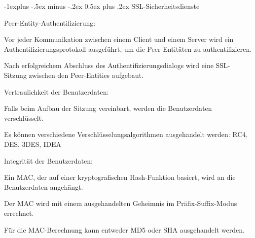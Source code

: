 \documentclass[a4paper]{article}
\makeatletter
\renewcommand{\subsection}{\@startsection{subsection}{2}{0mm}%
 {-1explus -.5ex minus -.2ex}%
 {0.5ex plus .2ex}%
 {\normalfont\normalsize\bfseries}}
\makeatother
\begin{document}
\begin{multicols}{3}
      \subsection{SSL-Sicherheitsdienste}
      \begin{itemize*}
            \item Peer-Entity-Authentifizierung:
            \begin{itemize*}
                  \item Vor jeder Kommunikation zwischen einem Client und einem Server wird ein Authentifizierungsprotokoll ausgeführt, um die Peer-Entitäten zu authentifizieren.
                  \item Nach erfolgreichem Abschluss des Authentifizierungsdialogs wird eine SSL-Sitzung zwischen den Peer-Entities aufgebaut.
            \end{itemize*}
            \item Vertraulichkeit der Benutzerdaten:
            \begin{itemize*}
                  \item Falls beim Aufbau der Sitzung vereinbart, werden die Benutzerdaten verschlüsselt.
                  \item Es können verschiedene Verschlüsselungsalgorithmen ausgehandelt werden: RC4, DES, 3DES, IDEA
            \end{itemize*}
            \item Integrität der Benutzerdaten:
            \begin{itemize*}
                  \item Ein MAC, der auf einer kryptografischen Hash-Funktion basiert, wird an die Benutzerdaten angehängt.
                  \item Der MAC wird mit einem ausgehandelten Geheimnis im Präfix-Suffix-Modus errechnet.
                  \item Für die MAC-Berechnung kann entweder MD5 oder SHA ausgehandelt werden.
            \end{itemize*}
      \end{itemize*}


\end{multicols}
\end{document}
